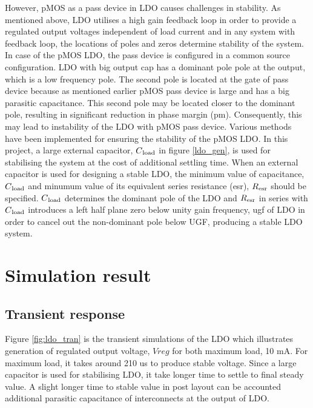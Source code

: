 \documentclass[12pt,a4paper,UKenglish]{report}
\begin{document}
However, pMOS as a pass device in LDO causes challenges in stability. As mentioned above, LDO utilises a high 
gain feedback loop in order to provide a regulated output voltages independent of load current and in any system 
with feedback loop, the locations of poles and zeros determine stability of the system.  In case of the pMOS LDO, 
the pass device is configured in a common source configuration. LDO with big output cap has a dominant pole pole 
at the output, which is a low frequency pole. The second pole is located at the gate of pass device because as 
mentioned earlier pMOS pass device is large and has a big parasitic capacitance. This second pole may be located 
closer to the dominant pole, resulting in significant  reduction in phase margin (\acrshort{pm}). Consequently, 
this may lead to instability of the LDO with pMOS pass device.  Various methods have been implemented for 
ensuring the stability of the pMOS LDO. In this project, a large external capacitor, $C\textsubscript{load}$ in 
figure \ref{ldo_gen}, is used for stabilising the system at the cost of additional settling time. When an 
external capacitor is used for designing a stable LDO, the minimum value of capacitance, $C\textsubscript{load}$ 
and minumum value of its equivalent series resistance (\acrshort{esr}), $R\textsubscript{esr}$ should be 
specified\cite{ldo_ti_stability}. $C\textsubscript{load}$ determines the dominant pole of the LDO and 
$R\textsubscript{esr}$ in series with $C\textsubscript{load}$ introduces a left half plane zero below unity 
gain frequency, \acrshort{ugf} of LDO in order to cancel out the non-dominant pole below UGF, producing a 
stable LDO system. \\

\section{Simulation result}

\subsection{Transient response}	%

Figure \ref{fig:ldo_tran} is the transient simulations of the LDO which illustrates generation of  regulated output voltage, $Vreg$ for 
both maximum load, 10 mA. For maximum load, it takes around 210 us to produce stable voltage. Since a large capacitor is used for stabilising LDO, it take longer time to settle to final steady value. A slight longer time to stable value in post layout can be accounted additional parasitic capacitance of interconnects at the output of LDO.\\
\end{document}

